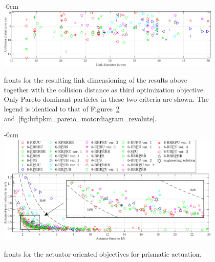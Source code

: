 \vspace{3pt}
\begin{figure}[H]
  \begin{adjustwidth}{-\extralength}{0cm}
    \centering
    \includegraphics{Figures/lufipkm_pareto_linkdiam_colldist_groups_linkdiam_vs_coll_nolegend.pdf}
  \end{adjustwidth}
  \caption{ fronts for the resulting link dimensioning of the results above together with the collision distance as third optimization objective. Only Pareto-dominant particles in these two criteria are shown. The legend is identical to that of Figures~\ref{fig:lufipkm_pareto_motordiagram_prismatic} and~\ref{fig:lufipkm_pareto_motordiagram_revolute}.}
  \label{fig:lufipkm_pareto_linkdiam_colldist}
\end{figure}



\begin{figure}[H]
  \begin{adjustwidth}{-\extralength}{0cm}
    \centering
    \includegraphics{Figures/lufipkm_pareto_actforce_actvelo_groups_motordiagram_prismatic.pdf}
  \end{adjustwidth}
  \caption{ fronts for the actuator-oriented objectives for prismatic actuation.}
  \label{fig:lufipkm_pareto_motordiagram_prismatic}
\end{figure}

